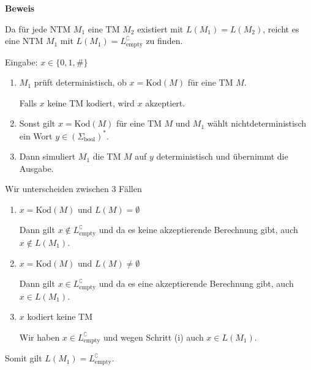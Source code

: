 \documentclass[a4paper, 11pt]{article}
\begin{document}
                    \textbf{Beweis}
                
                    Da für jede NTM $M_1$ eine TM $M_2$ existiert mit $L(M_1) = L(M_2)$, reicht es eine NTM $M_1$ mit $L(M_1) = L_{\text{empty}}^\complement$ zu finden.
                
                    Eingabe: $x \in \{0,1,\#\}$
                    \begin{enumerate}[label=(\roman*)]
                        \item $M_1$ prüft deterministisch, ob $x = \text{Kod}(M)$ für eine TM $M$. 
                        
                        Falls $x$ keine TM kodiert, wird $x$ akzeptiert.
                        
                        \item Sonst gilt $x = \text{Kod}(M)$ für eine TM $M$ und $M_1$ wählt nichtdeterministisch ein Wort $y \in (\Sigma_{\text{bool}})^*$. 
                        
                        \item Dann simuliert $M_1$ die TM $M$ auf $y$ deterministisch und übernimmt die Ausgabe. 
                    \end{enumerate} 
                
                
                    Wir unterscheiden zwischen 3 Fällen
                    \begin{enumerate}[label = \Roman*]
                        
                        \item $x = \text{Kod}(M)$ und $L(M) = \emptyset$
                        
                        Dann gilt $x \notin L_{\text{empty}}^\complement$ und da es keine akzeptierende Berechnung gibt, auch $x \notin L(M_1)$.
                        
                        \item $x = \text{Kod}(M)$ und $L(M) \neq \emptyset$
                        
                        Dann gilt $x \in L_{\text{empty}}^\complement$ und da es eine akzeptierende Berechnung gibt, auch $x \in L(M_1)$.
                        
                        \item $x$ kodiert keine TM
                        
                        Wir haben $x \in L_{\text{empty}}^\complement$ und wegen Schritt (i) auch $x \in L(M_1)$.
                    \end{enumerate}
                    Somit gilt $L(M_1) = L_{\text{empty}}^\complement$.
                
\end{document}
